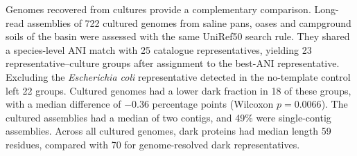 \documentclass[11pt]{article}
\begin{document}
Genomes recovered from cultures provide a complementary comparison. Long-read assemblies of
722 cultured genomes from saline pans, oases and campground soils of the basin were assessed
with the same UniRef50 search rule. They shared a species-level ANI match with 25 catalogue
representatives, yielding 23 representative--culture groups after assignment to the best-ANI
representative. Excluding the \emph{Escherichia coli} representative detected in the no-template
control left 22 groups. Cultured genomes had a lower dark fraction in 18 of these groups,
with a median difference of $-0.36$ percentage points (Wilcoxon $p = 0.0066$).
The cultured assemblies had a median of two contigs, and 49\% were single-contig assemblies.
Across all cultured genomes, dark proteins had median length 59 residues, compared with 70 for
genome-resolved dark representatives.
\end{document}
